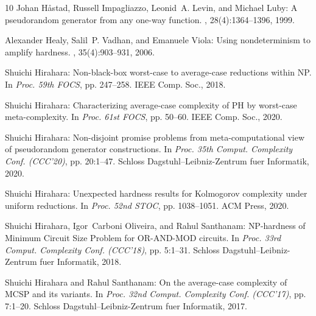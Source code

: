 \documentclass[11pt]{article}
\numberwithin{equation}{section}
\theoremstyle{definition}
\theoremstyle{plain}
\begin{document}
\begin{thebibliography}{10}
{\sc Johan H{\aa}stad, Russell Impagliazzo, Leonid~A. Levin, and Michael Luby}:
  A pseudorandom generator from any one-way function.
, 28(4):1364--1396, 1999.
\newblock [\epfmtdoi{10.1137/S0097539793244708}]

{\sc Alexander Healy, Salil~P. Vadhan, and Emanuele Viola}: Using
  nondeterminism to amplify hardness.
, 35(4):903--931, 2006.
\newblock [\epfmtdoi{10.1137/S0097539705447281}]

{\sc Shuichi Hirahara}: Non-black-box worst-case to average-case reductions
  within {NP}.
\newblock In {\em Proc. 59th FOCS}, pp. 247--258. IEEE Comp. Soc., 2018.

{\sc Shuichi Hirahara}: Characterizing average-case complexity of {PH} by
  worst-case meta-complexity.
\newblock In {\em Proc. 61st FOCS}, pp. 50--60. IEEE Comp. Soc., 2020.

{\sc Shuichi Hirahara}: Non-disjoint promise problems from meta-computational
  view of pseudorandom generator constructions.
\newblock In {\em Proc. 35th Comput. Complexity Conf. (CCC'20)}, pp. 20:1--47.
  Schloss Dagstuhl--Leibniz-Zentrum fuer Informatik, 2020.

{\sc Shuichi Hirahara}: Unexpected hardness results for {K}olmogorov complexity
  under uniform reductions.
\newblock In {\em Proc. 52nd STOC}, pp. 1038--1051. ACM Press, 2020.
\newblock [\epfmtdoi{10.1145/3357713.3384251}]

{\sc Shuichi Hirahara, Igor~Carboni Oliveira, and Rahul Santhanam}:
  {NP}-hardness of {M}inimum {C}ircuit {S}ize {P}roblem for {OR-AND-MOD}
  circuits.
\newblock In {\em Proc. 33rd Comput. Complexity Conf. (CCC'18)}, pp. 5:1--31.
  Schloss Dagstuhl--Leibniz-Zentrum fuer Informatik, 2018.

{\sc Shuichi Hirahara and Rahul Santhanam}: On the average-case complexity of
  {MCSP} and its variants.
\newblock In {\em Proc. 32nd Comput. Complexity Conf. (CCC'17)}, pp. 7:1--20.
  Schloss Dagstuhl--Leibniz-Zentrum fuer Informatik, 2017.


\end{thebibliography}
\end{document}

